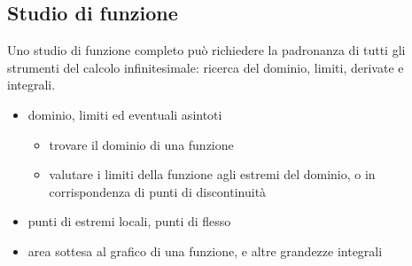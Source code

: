 \documentclass[letterpaper,10pt,italian]{jupyterBook}
\begin{document}
\subsection{Studio di funzione}
\label{\detokenize{ch/infinitesimal_calculus/analysis:studio-di-funzione}}\label{\detokenize{ch/infinitesimal_calculus/analysis:infinitesimal-calculus-analysis-applications-fun}}
\sphinxAtStartPar
Uno studio di funzione completo può richiedere la padronanza di tutti gli strumenti del calcolo infinitesimale: ricerca del dominio, limiti, derivate e integrali.
\begin{itemize}
\item {} 
\sphinxAtStartPar
{\hyperref[\detokenize{ch/infinitesimal_calculus/analysis:infinitesimal-calculus-analysis-applications-fun}]{}} \sphinxhyphen{} dominio, limiti ed eventuali asintoti
\begin{itemize}
\item {} 
\sphinxAtStartPar
trovare il dominio di una funzione

\item {} 
\sphinxAtStartPar
valutare i limiti della funzione agli estremi del dominio, o in corrispondenza di punti di discontinuità

\end{itemize}

\item {} 
\sphinxAtStartPar
{\hyperref[\detokenize{ch/infinitesimal_calculus/derivatives:infinitesimal-calculus-derivatives-applications-fun}]{}} \sphinxhyphen{} punti di estremi locali, punti di flesso

\item {} 
\sphinxAtStartPar
{\hyperref[\detokenize{ch/infinitesimal_calculus/integrals:infinitesimal-calculus-integrals-applications-fun}]{}} \sphinxhyphen{} area sottesa al grafico di una funzione, e altre grandezze integrali

\end{itemize}
\end{document}

